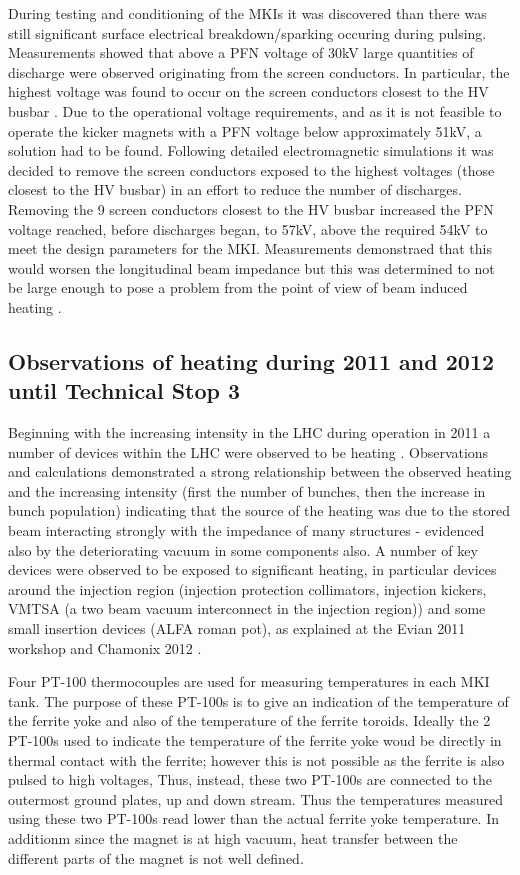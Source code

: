 During testing and conditioning of the MKIs it was discovered than there was still significant surface electrical breakdown/sparking occuring during pulsing. Measurements showed that above a PFN voltage of 30kV large quantities of discharge were observed originating from the screen conductors. In particular, the highest voltage was found to occur on the screen conductors closest to the HV busbar \cite{Barnes:improvBeamScreen}. Due to the operational voltage requirements, and as it is not feasible to operate the kicker magnets with a PFN voltage below approximately 51kV, a solution had to be found. Following detailed electromagnetic simulations it was decided to remove the screen conductors exposed to the highest voltages (those closest to the HV busbar) in an effort to reduce the number of discharges. Removing the 9 screen conductors closest to the HV busbar increased the PFN voltage reached, before discharges began, to 57kV, above the required 54kV to meet the design parameters for the MKI. Measurements demonstraed that this would worsen the longitudinal beam impedance but this was determined to not be large enough to pose a problem from the point of view of beam induced heating \cite{Barnes:improvBeamScreen}.

\subsection{Observations of heating during 2011 and 2012 until Technical Stop 3}

Beginning with the increasing intensity in the LHC during operation in 2011 a number of devices within the LHC were observed to be heating \cite{Metral:Heating, Salvant:Heating}. Observations and calculations demonstrated a strong relationship between the observed heating and the increasing intensity (first the number of bunches, then the increase in bunch population) indicating that the source of the heating was due to the stored beam interacting strongly with the impedance of many structures - evidenced also by the deteriorating vacuum in some components also. A number of key devices were observed to be exposed to significant heating, in particular devices around the injection region (injection protection collimators, injection kickers, VMTSA (a two beam vacuum interconnect in the injection region)) and some small insertion devices (ALFA roman pot), as explained at the Evian 2011 workshop \cite{Salvant:Heating} and Chamonix 2012 \cite{Metral:Heating}. 

Four PT-100 thermocouples are used for measuring temperatures in each MKI tank. The purpose of these PT-100s is to give an indication of the temperature of the ferrite yoke and also of the temperature of the ferrite toroids. Ideally the 2 PT-100s used to indicate the temperature of the ferrite yoke woud be directly in thermal contact with the ferrite; however this is not possible as the ferrite is also pulsed to high voltages, Thus, instead, these two PT-100s are connected to the outermost ground plates, up and down stream. Thus the temperatures measured using these two PT-100s read lower than the actual ferrite yoke temperature. In additionm since the magnet is at high vacuum, heat transfer between the different parts of the magnet is not well defined.

